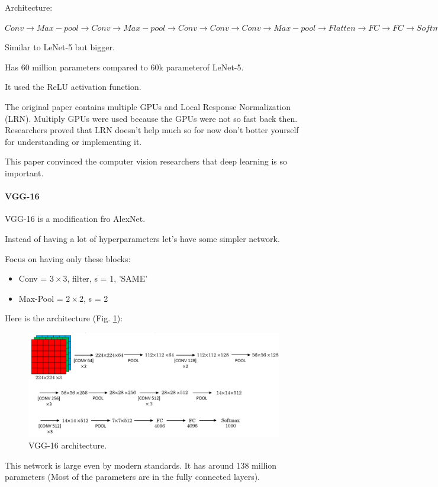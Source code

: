 Architecture:

$Conv \to Max-pool\to Conv\to Max-pool\to Conv\to Conv\to Conv\to Max-pool\to Flatten\to FC\to FC\to Softmax$

Similar to LeNet-5 but bigger.

Has 60 million parameters compared to 60k parameterof LeNet-5.

It used the ReLU activation function.

The original paper contains multiple GPUs and Local Response Normalization (LRN). Multiply GPUs were used because the GPUs were not so fast back then. Researchers proved that LRN doesn't help much so for now don't botter yourself for understanding or implementing it.

This paper convinced the computer vision researchers that deep learning is so important.

\paragraph{VGG-16} VGG-16 \cite{simonyan2014very} is a modification fro AlexNet.

Instead of having a lot of hyperparameters let's have some simpler network.

Focus on having only these blocks:
\begin{itemize}
    \item Conv = $3\times 3$, filter, s = 1, 'SAME'
    \item Max-Pool = $2\times 2$, s = 2
\end{itemize}

Here is the architecture (Fig. \ref{vgg16}):

\begin{figure}[!htbp]
    \centering
    \includegraphics[width=1.0\textwidth]{img/c4/vgg16.png}
    \caption{VGG-16 architecture.}
    \label{vgg16}
\end{figure}

This network is large even by modern standards. It has around 138 million parameters (Most of the parameters are in the fully connected layers).

